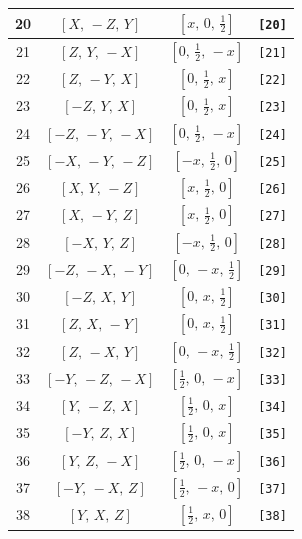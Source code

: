 \documentclass[fleqn,8pt]{jsarticle}
\begin{document}
\begin{longtable}{cccc}
20 & $\left[ X,\, - Z,\, Y \right]$ & $\left[ x,\, 0,\, \frac{1}{2} \right]$ & {\tt [20]} \\ \hline
21 & $\left[ Z,\, Y,\, - X \right]$ & $\left[ 0,\, \frac{1}{2},\, - x \right]$ & {\tt [21]} \\ \hline
22 & $\left[ Z,\, - Y,\, X \right]$ & $\left[ 0,\, \frac{1}{2},\, x \right]$ & {\tt [22]} \\ \hline
23 & $\left[ - Z,\, Y,\, X \right]$ & $\left[ 0,\, \frac{1}{2},\, x \right]$ & {\tt [23]} \\ \hline
24 & $\left[ - Z,\, - Y,\, - X \right]$ & $\left[ 0,\, \frac{1}{2},\, - x \right]$ & {\tt [24]} \\ \hline
25 & $\left[ - X,\, - Y,\, - Z \right]$ & $\left[ - x,\, \frac{1}{2},\, 0 \right]$ & {\tt [25]} \\ \hline
26 & $\left[ X,\, Y,\, - Z \right]$ & $\left[ x,\, \frac{1}{2},\, 0 \right]$ & {\tt [26]} \\ \hline
27 & $\left[ X,\, - Y,\, Z \right]$ & $\left[ x,\, \frac{1}{2},\, 0 \right]$ & {\tt [27]} \\ \hline
28 & $\left[ - X,\, Y,\, Z \right]$ & $\left[ - x,\, \frac{1}{2},\, 0 \right]$ & {\tt [28]} \\ \hline
29 & $\left[ - Z,\, - X,\, - Y \right]$ & $\left[ 0,\, - x,\, \frac{1}{2} \right]$ & {\tt [29]} \\ \hline
30 & $\left[ - Z,\, X,\, Y \right]$ & $\left[ 0,\, x,\, \frac{1}{2} \right]$ & {\tt [30]} \\ \hline
31 & $\left[ Z,\, X,\, - Y \right]$ & $\left[ 0,\, x,\, \frac{1}{2} \right]$ & {\tt [31]} \\ \hline
32 & $\left[ Z,\, - X,\, Y \right]$ & $\left[ 0,\, - x,\, \frac{1}{2} \right]$ & {\tt [32]} \\ \hline
33 & $\left[ - Y,\, - Z,\, - X \right]$ & $\left[ \frac{1}{2},\, 0,\, - x \right]$ & {\tt [33]} \\ \hline
34 & $\left[ Y,\, - Z,\, X \right]$ & $\left[ \frac{1}{2},\, 0,\, x \right]$ & {\tt [34]} \\ \hline
35 & $\left[ - Y,\, Z,\, X \right]$ & $\left[ \frac{1}{2},\, 0,\, x \right]$ & {\tt [35]} \\ \hline
36 & $\left[ Y,\, Z,\, - X \right]$ & $\left[ \frac{1}{2},\, 0,\, - x \right]$ & {\tt [36]} \\ \hline
37 & $\left[ - Y,\, - X,\, Z \right]$ & $\left[ \frac{1}{2},\, - x,\, 0 \right]$ & {\tt [37]} \\ \hline
38 & $\left[ Y,\, X,\, Z \right]$ & $\left[ \frac{1}{2},\, x,\, 0 \right]$ & {\tt [38]} \\ \hline

\end{longtable}
\end{document}
